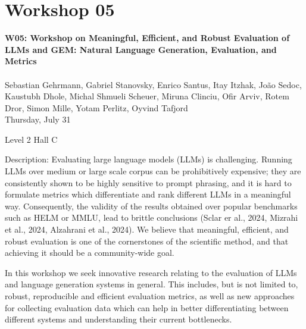\clearpage


\section[W05: Workshop on Meaningful, Efficient, and Robust Evaluation of LLMs and GEM: Natural Language Generation, Evaluation, and Metrics]{Workshop 05}
\label{workshop_5}

\begin{center}
    {\Large \textbf{W05: Workshop on Meaningful, Efficient, and Robust Evaluation of LLMs and GEM: Natural Language Generation, Evaluation, and Metrics}}\\
\\

    Sebastian Gehrmann, Gabriel Stanovsky, Enrico Santus, Itay Itzhak, João Sedoc, Kaustubh Dhole, Michal Shmueli Scheuer, Miruna Clinciu, Ofir Arviv, Rotem Dror, Simon Mille, Yotam Perlitz, Oyvind Tafjord\\

    Thursday, July 31
    
    Level 2 Hall C

\end{center}

Description: Evaluating large language models (LLMs) is challenging. Running LLMs over medium or large scale corpus can be prohibitively expensive; they are consistently shown to be highly sensitive to prompt phrasing, and it is hard to formulate metrics which differentiate and rank different LLMs in a meaningful way. Consequently, the validity of the results obtained over popular benchmarks such as HELM or MMLU, lead to brittle conclusions (Sclar er al., 2024, Mizrahi et al., 2024, Alzahrani et al., 2024). We believe that meaningful, efficient, and robust evaluation is one of the cornerstones of the scientific method, and that achieving it should be a community-wide goal.

In this workshop we seek innovative research relating to the evaluation of LLMs and language generation systems in general. This includes, but is not limited to, robust, reproducible and efficient evaluation metrics, as well as new approaches for collecting evaluation data which can help in better differentiating between different systems and understanding their current bottlenecks.


